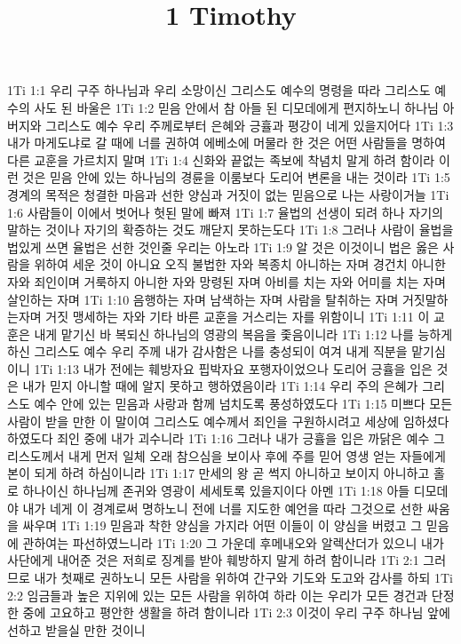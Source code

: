 

\title{1 Timothy}

1Ti 1:1  우리 구주 하나님과 우리 소망이신 그리스도 예수의 명령을 따라 그리스도 예수의 사도 된 바울은
1Ti 1:2  믿음 안에서 참 아들 된 디모데에게 편지하노니 하나님 아버지와 그리스도 예수 우리 주께로부터 은혜와 긍휼과 평강이 네게 있을지어다
1Ti 1:3  내가 마게도냐로 갈 때에 너를 권하여 에베소에 머물라 한 것은 어떤 사람들을 명하여 다른 교훈을 가르치지 말며
1Ti 1:4  신화와 끝없는 족보에 착념치 말게 하려 함이라 이런 것은 믿음 안에 있는 하나님의 경륜을 이룸보다 도리어 변론을 내는 것이라
1Ti 1:5  경계의 목적은 청결한 마음과 선한 양심과 거짓이 없는 믿음으로 나는 사랑이거늘
1Ti 1:6  사람들이 이에서 벗어나 헛된 말에 빠져
1Ti 1:7  율법의 선생이 되려 하나 자기의 말하는 것이나 자기의 확증하는 것도 깨닫지 못하는도다
1Ti 1:8  그러나 사람이 율법을 법있게 쓰면 율법은 선한 것인줄 우리는 아노라
1Ti 1:9  알 것은 이것이니 법은 옳은 사람을 위하여 세운 것이 아니요 오직 불법한 자와 복종치 아니하는 자며 경건치 아니한 자와 죄인이며 거룩하지 아니한 자와 망령된 자며 아비를 치는 자와 어미를 치는 자며 살인하는 자며
1Ti 1:10  음행하는 자며 남색하는 자며 사람을 탈취하는 자며 거짓말하는자며 거짓 맹세하는 자와 기타 바른 교훈을 거스리는 자를 위함이니
1Ti 1:11  이 교훈은 내게 맡기신 바 복되신 하나님의 영광의 복음을 좇음이니라
1Ti 1:12  나를 능하게 하신 그리스도 예수 우리 주께 내가 감사함은 나를 충성되이 여겨 내게 직분을 맡기심이니
1Ti 1:13  내가 전에는 훼방자요 핍박자요 포행자이었으나 도리어 긍휼을 입은 것은 내가 믿지 아니할 때에 알지 못하고 행하였음이라
1Ti 1:14  우리 주의 은혜가 그리스도 예수 안에 있는 믿음과 사랑과 함께 넘치도록 풍성하였도다
1Ti 1:15  미쁘다 모든 사람이 받을 만한 이 말이여 그리스도 예수께서 죄인을 구원하시려고 세상에 임하셨다 하였도다 죄인 중에 내가 괴수니라
1Ti 1:16  그러나 내가 긍휼을 입은 까닭은 예수 그리스도께서 내게 먼저 일체 오래 참으심을 보이사 후에 주를 믿어 영생 얻는 자들에게 본이 되게 하려 하심이니라
1Ti 1:17  만세의 왕 곧 썩지 아니하고 보이지 아니하고 홀로 하나이신 하나님께 존귀와 영광이 세세토록 있을지이다 아멘
1Ti 1:18  아들 디모데야 내가 네게 이 경계로써 명하노니 전에 너를 지도한 예언을 따라 그것으로 선한 싸움을 싸우며
1Ti 1:19  믿음과 착한 양심을 가지라 어떤 이들이 이 양심을 버렸고 그 믿음에 관하여는 파선하였느니라
1Ti 1:20  그 가운데 후메내오와 알렉산더가 있으니 내가 사단에게 내어준 것은 저희로 징계를 받아 훼방하지 말게 하려 함이니라
1Ti 2:1  그러므로 내가 첫째로 권하노니 모든 사람을 위하여 간구와 기도와 도고와 감사를 하되
1Ti 2:2  임금들과 높은 지위에 있는 모든 사람을 위하여 하라 이는 우리가 모든 경건과 단정한 중에 고요하고 평안한 생활을 하려 함이니라
1Ti 2:3  이것이 우리 구주 하나님 앞에 선하고 받을실 만한 것이니
